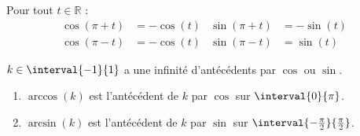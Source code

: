 \documentclass[main.tex]{subfiles}
\begin{document}
\begin{property} Pour tout $t\in\mathbb{R}$ :
	\setlength{\abovedisplayskip}{3pt}
	\setlength{\belowdisplayskip}{3pt}  
	\begin{align*}
	\cos(\pi+t)&=-\cos(t) &  	\sin(\pi+t)&=-\sin(t) \\
	\cos(\pi-t)&=-\cos(t) &  	\sin(\pi-t)&=\sin(t)  
	\end{align*}
\end{property} 
\begin{remark}
$k\in\interval{-1}{1}$ a une infinité d'antécédents par    $\cos$ ou $\sin$. 
\begin{enumerate}[leftmargin=*,label=\textbullet]
	\item $\arccos(k)$ est l'antécédent de $k$ par $\cos$ sur $\interval{0}{\pi}$.
	\item $\arcsin(k)$ est l'antécédent de $k$ par $\sin$ sur $\interval{-\tfrac{\pi}{2}}{\tfrac{\pi}{2}}$.
\end{enumerate}
\end{remark}
\end{document}
